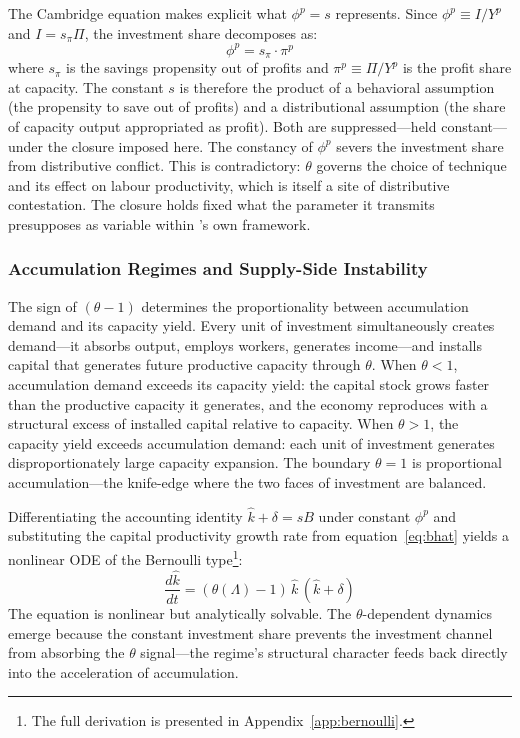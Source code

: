 The Cambridge equation makes explicit what $\phi^p = s$ represents. Since $\phi^p \equiv I/Y^p$ and $I = s_\pi \Pi$, the investment share decomposes as:
%
\begin{equation}\label{eq:cambridge}
	\phi^p = s_\pi \cdot \pi^p
\end{equation}
%
where $s_\pi$ is the savings propensity out of profits and $\pi^p \equiv \Pi/Y^p$ is the profit share at capacity. The constant $s$ is therefore the product of a behavioral assumption (the propensity to save out of profits) and a distributional assumption (the share of capacity output appropriated as profit). Both are suppressed---held constant---under the closure imposed here. The constancy of $\phi^p$ severs the investment share from distributive conflict. This is contradictory: $\theta$ governs the choice of technique and its effect on labour productivity, which is itself a site of distributive contestation. The closure holds fixed what the parameter it transmits presupposes as variable within \citet{Shaikh2016}'s own framework.



\subsubsection{Accumulation Regimes and Supply-Side Instability}
\label{sec:regimes}

The sign of $(\theta - 1)$ determines the proportionality between accumulation demand and its capacity yield. Every unit of investment simultaneously creates demand---it absorbs output, employs workers, generates income---and installs capital that generates future productive capacity through $\theta$. When $\theta < 1$, accumulation demand exceeds its capacity yield: the capital stock grows faster than the productive capacity it generates, and the economy reproduces with a structural excess of installed capital relative to capacity. When $\theta > 1$, the capacity yield exceeds accumulation demand: each unit of investment generates disproportionately large capacity expansion. The boundary $\theta = 1$ is proportional accumulation---the knife-edge where the two faces of investment are balanced.

Differentiating the accounting identity $\hat{k} + \delta = sB$ under constant $\phi^p$ and substituting the capital productivity growth rate from equation~\eqref{eq:bhat} yields a nonlinear ODE of the Bernoulli type\footnote{The full derivation is presented in Appendix~\ref{app:bernoulli}.}:
%
\begin{equation}\label{eq:bernoulli}
	\boxed{\frac{d\hat{k}}{dt} = (\theta(\Lambda) - 1)\,\hat{k}\,(\hat{k} + \delta)}
\end{equation}
%
The equation is nonlinear but analytically solvable. The $\theta$-dependent dynamics emerge because the constant investment share prevents the investment channel from absorbing the $\theta$ signal---the regime's structural character feeds back directly into the acceleration of accumulation.

